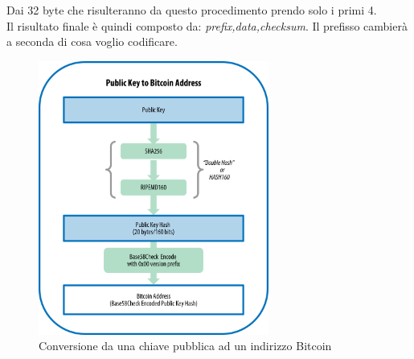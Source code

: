Dai 32 byte che risulteranno da questo procedimento prendo solo i primi 4.\\
Il risultato finale \`e quindi composto da: \textit{prefix,data,checksum}.
Il prefisso cambier\`a a seconda di cosa voglio codificare.
\begin{figure}[!h]
   \includegraphics[width=0.675\textwidth]{imgs/address.png}
   \caption{Conversione da una chiave pubblica ad un indirizzo Bitcoin}
\end{figure}



